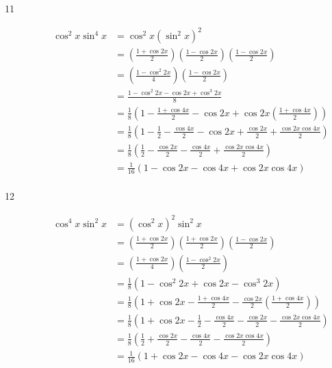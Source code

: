 \documentclass{exam}
\begin{document}
\begin{description}
      \item[11]
        \begin{align*}
          \cos^2 x \sin^4 x & = \cos^2 x \left( \sin^2 x \right)^2 \\
                            & = \left( \frac{1 + \cos 2x}{2} \right) \left( \frac{1 - \cos 2x}{2} \right) \left( \frac{1 - \cos 2x}{2} \right) \\
                            & = \left( \frac{1 - \cos^2 2x}{4} \right) \left( \frac{1 - \cos 2x}{2} \right) \\
                            & = \frac{1 - \cos^2 2x - \cos 2x + \cos^3 2x}{8} \\
                            & = \frac{1}{8} \left( 1 - \frac{1 + \cos 4x}{2} - \cos 2x + \cos 2x \left( \frac{1 + \cos 4x}{2} \right) \right) \\
                            & = \frac{1}{8} \left( 1 - \frac{1}{2} - \frac{\cos 4x}{2} - \cos 2x + \frac{\cos 2x}{2} + \frac{\cos 2x \cos 4x}{2} \right) \\
                            & = \frac{1}{8} \left( \frac{1}{2} - \frac{\cos 2x}{2} - \frac{\cos 4x}{2} + \frac{\cos 2x \cos 4x}{2} \right) \\
                            & = \frac{1}{16} ( 1 - \cos 2x - \cos 4x + \cos 2x \cos 4x ) \\
        \end{align*}

      \item[12]
        \begin{align*}
          \cos^4 x \sin^2 x & = \left( \cos^2 x \right)^2 \sin^2 x \\
                            & = \left( \frac{1 + \cos 2x}{2} \right) \left( \frac{1 + \cos 2x}{2} \right) \left( \frac{1 - \cos 2x}{2} \right) \\
                            & = \left( \frac{1 + \cos 2x}{4} \right) \left( \frac{1 - \cos^2 2x}{2} \right) \\
                            & = \frac{1}{8} \left( 1 - \cos^2 2x + \cos 2x - \cos^3 2x \right) \\
                            & = \frac{1}{8} \left( 1 + \cos 2x - \frac{1 + \cos 4x}{2}  - \frac{\cos 2x}{2} \left( \frac{1 + \cos 4x}{2} \right) \right) \\
                            & = \frac{1}{8} \left( 1 + \cos 2x - \frac{1}{2}  - \frac{\cos 4x}{2} - \frac{\cos 2x}{2} - \frac{\cos 2x \cos 4x}{2} \right) \\
                            & = \frac{1}{8} \left( \frac{1}{2} + \frac{\cos 2x}{2} - \frac{\cos 4x}{2}  - \frac{\cos 2x \cos 4x}{2} \right) \\
                            & = \frac{1}{16} \left( 1 + \cos 2x - \cos 4x  - \cos 2x \cos 4x \right) \\
        \end{align*}


\end{description}
\end{document}
